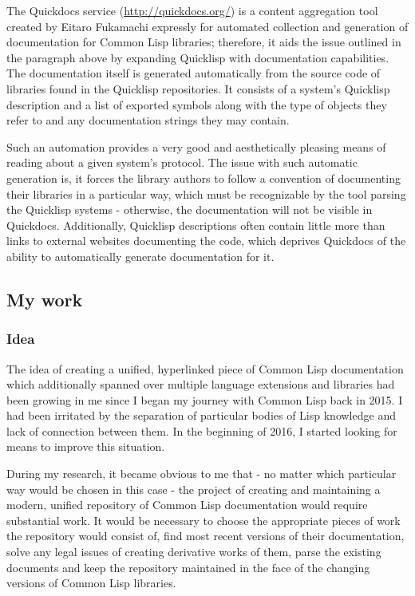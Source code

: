 \begin{enumerate}
  The Quickdocs service (\url{http://quickdocs.org/}) is a content
  aggregation tool created by Eitaro Fukamachi expressly for automated
  collection and generation of documentation for Common Lisp libraries;
  therefore, it aids the issue outlined in the paragraph above by
  expanding Quicklisp with documentation capabilities. The documentation
  itself is generated automatically from the source code of libraries
  found in the Quicklisp repositories. It consists of a system's
  Quicklisp description and a list of exported symbols along with the
  type of objects they refer to and any documentation strings they may
  contain.

  Such an automation provides a very good and aesthetically pleasing
  means of reading about a given system's protocol. The issue with such
  automatic generation is, it forces the library authors to follow a
  convention of documenting their libraries in a particular way, which
  must be recognizable by the tool parsing the Quicklisp systems -
  otherwise, the documentation will not be visible in Quickdocs.
  Additionally, Quicklisp descriptions often contain little more than
  links to external websites documenting the code, which deprives
  Quickdocs of the ability to automatically generate documentation for
  it.
\end{enumerate}

\subsection{My work}\label{my-work}

\subsubsection{Idea}\label{idea}

The idea of creating a unified, hyperlinked piece of Common Lisp
documentation which additionally spanned over multiple language
extensions and libraries had been growing in me since I began my journey
with Common Lisp back in 2015. I had been irritated by the separation of
particular bodies of Lisp knowledge and lack of connection between them.
In the beginning of 2016, I started looking for means to improve this
situation.

During my research, it became obvious to me that - no matter which
particular way would be chosen in this case - the project of creating
and maintaining a modern, unified repository of Common Lisp
documentation would require substantial work. It would be necessary to
choose the appropriate pieces of work the repository would consist of,
find most recent versions of their documentation, solve any legal issues
of creating derivative works of them, parse the existing documents and
keep the repository maintained in the face of the changing versions of
Common Lisp libraries.

